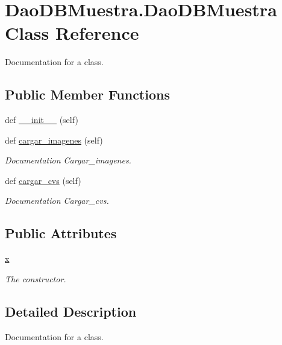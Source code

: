 \hypertarget{class_dao_d_b_muestra_1_1_dao_d_b_muestra}{}\section{Dao\+D\+B\+Muestra.\+Dao\+D\+B\+Muestra Class Reference}
\label{class_dao_d_b_muestra_1_1_dao_d_b_muestra}


Documentation for a class.  


\subsection*{Public Member Functions}
\begin{DoxyCompactItemize}
\item 
def \mbox{\hyperlink{class_dao_d_b_muestra_1_1_dao_d_b_muestra_a2afebcfa528b35baac5ac22efe078023}{\+\_\+\+\_\+init\+\_\+\+\_\+}} (self)
\item 
def \mbox{\hyperlink{class_dao_d_b_muestra_1_1_dao_d_b_muestra_a715cd7d4e90be2ee07152c6e9f28aef6}{cargar\+\_\+imagenes}} (self)
\begin{DoxyCompactList}\small\item\em Documentation Cargar\+\_\+imagenes. \end{DoxyCompactList}\item 
def \mbox{\hyperlink{class_dao_d_b_muestra_1_1_dao_d_b_muestra_a3c3bcbaf445c3dbddabfd0d6da6a2596}{cargar\+\_\+cvs}} (self)
\begin{DoxyCompactList}\small\item\em Documentation Cargar\+\_\+cvs. \end{DoxyCompactList}\end{DoxyCompactItemize}
\subsection*{Public Attributes}
\begin{DoxyCompactItemize}
\item 
\mbox{\hyperlink{class_dao_d_b_muestra_1_1_dao_d_b_muestra_aa3ded640da73e60fd7371465deb482b6}{x}}
\begin{DoxyCompactList}\small\item\em The constructor. \end{DoxyCompactList}\end{DoxyCompactItemize}


\subsection{Detailed Description}
Documentation for a class. 

